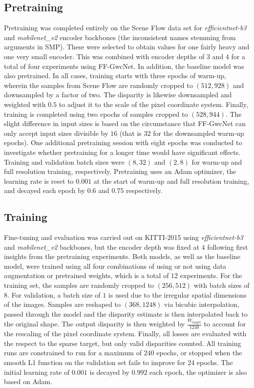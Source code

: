 \documentclass[runningheads]{llncs}
\begin{document}
\subsection{Pretraining}
Pretraining was completed entirely on the Scene Flow data set for \textit{efficientnet-b3} and \textit{mobilenet\_v2} encoder backbones (the inconsistent names stemming from arguments in SMP). These were selected to obtain values for one fairly heavy and one very small encoder. This was combined with encoder depths of $3$ and $4$ for a total of four experiments using FF-GwcNet. In addition, the baseline model was also pretrained. In all cases, training starts with three epochs of warm-up, wherein the samples from Scene Flow are randomly cropped to $(512,928)$ and downsampled by a factor of two. The disparity is likewise downsampled and weighted with $0.5$ to adjust it to the scale of the pixel coordinate system. Finally, training is completed using two epochs of samples cropped to $(528, 944)$. The slight difference in input sizes is based on the circumstance that FF-GwcNet can only accept input sizes divisible by $16$ (that is $32$ for the downsampled warm-up epochs). One additional pretraining session with eight epochs was conducted to investigate whether pretraining for a longer time would have significant effects. Training and validation batch sizes were $(8,32)$ and $(2,8)$ for warm-up and full resolution training, respectively. Pretraining uses an Adam optimizer, the learning rate is reset to $0.001$ at the start of warm-up and full resolution training, and decayed each epoch by $0.6$ and $0.75$ respectively.

\subsection{Training}
Fine-tuning and evaluation was carried out on KITTI-2015 using \textit{efficientnet-b3} and \textit{mobilenet\_v2} backbones, but the encoder depth was fixed at $4$ following first insights from the pretraining experiments. Both models, as well as the baseline model, were trained using all four combinations of using or not using data augmentation or pretrained weights, which is a total of $12$ experiments. For the training set, the samples are randomly cropped to $(256,512)$ with batch sizes of $8$. For validation, a batch size of $1$ is used due to the irregular spatial dimensions of the images. Samples are reshaped to $(368, 1248)$ via bicubic interpolation, passed through the model and the disparity estimate is then interpolated back to the original shape. The output disparity is then weighted by $\frac{W_{\text{target}}}{1248}$ to account for the rescaling of the pixel coordinate system. Finally, all losses are evaluated with the respect to the sparse target, but only valid disparities counted. All training runs are constrained to run for a maximum of $240$ epochs, or stopped when the smooth L1 function on the validation set fails to improve for 24 epochs. The initial learning rate of $0.001$ is decayed by $0.992$ each epoch, the optimizer is also based on Adam.
\end{document}
